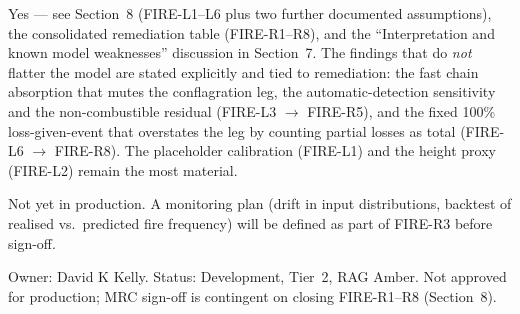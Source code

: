 \documentclass[11pt,a4paper]{article}
\begin{document}
Yes --- see Section~8 (FIRE-L1--L6 plus two further documented assumptions), the
consolidated remediation table (FIRE-R1--R8), and the ``Interpretation and known
model weaknesses'' discussion in Section~7. The findings that do \emph{not}
flatter the model are stated explicitly and tied to remediation: the fast chain
absorption that mutes the conflagration leg, the automatic-detection sensitivity
and the non-combustible residual (FIRE-L3 $\rightarrow$ FIRE-R5), and the fixed
100\% loss-given-event that overstates the leg by counting partial losses as
total (FIRE-L6 $\rightarrow$ FIRE-R8). The placeholder calibration (FIRE-L1) and
the height proxy (FIRE-L2) remain the most material.

Not yet in production. A monitoring plan (drift in input distributions,
backtest of realised vs.\ predicted fire frequency) will be defined as part of
FIRE-R3 before sign-off.

Owner: David K Kelly. Status: Development, Tier~2, RAG Amber. Not approved for
production; MRC sign-off is contingent on closing FIRE-R1--R8 (Section~8).

\mkmchangelog
\end{document}
